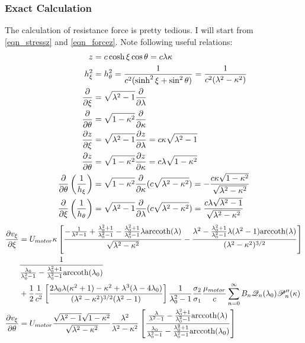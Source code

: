 \documentclass[fontsize=11pt, %
                             paper=a4, %
                             twoside, %
                             captions=tableheading,
                             index=totoc,
                             hyperref]{labbook}
\begin{document}
\begin{addmargin}[4cm]{0cm}
\subsubsection{Exact Calculation}
The calculation of resistance force is pretty tedious. I will start from \ref{eqn_stressz} and \ref{eqn_forcez}. Note following useful relations:
\begin{equation}
\begin{aligned}
z&=c\cosh\xi\cos\theta=c\lambda\kappa\\
h_\xi^2&=h_\theta^2=\frac{1}{c^2(\sinh^2\xi+\sin^2\theta)}=\frac{1}{c^2(\lambda^2-\kappa^2)}\\
\frac{\partial }{\partial \xi}&=\sqrt{\lambda^2-1}\frac{\partial }{\partial \lambda}\\
\frac{\partial }{\partial \theta}&=\sqrt{1-\kappa^2}\frac{\partial }{\partial \kappa}\\
\frac{\partial z}{\partial \xi}&=\sqrt{\lambda^2-1}\frac{\partial z}{\partial \lambda}=c\kappa\sqrt{\lambda^2-1}\\
\frac{\partial z}{\partial \theta}&=\sqrt{1-\kappa^2}\frac{\partial z}{\partial \kappa}=c\lambda\sqrt{1-\kappa^2}\\
\frac{\partial }{\partial \theta}\left(\frac{1}{h_\xi}\right)&=\sqrt{1-\kappa^2}\frac{\partial }{\partial \kappa}(c\sqrt{\lambda^2-\kappa^2})=-\frac{c\kappa\sqrt{1-\kappa^2}}{\sqrt{\lambda^2-\kappa^2}}\\
\frac{\partial }{\partial \xi}\left(\frac{1}{h_\theta}\right)&=\sqrt{\lambda^2-1}\frac{\partial }{\partial \lambda}(c\sqrt{\lambda^2-\kappa^2})=\frac{c\lambda\sqrt{\lambda^2-1}}{\sqrt{\lambda^2-\kappa^2}}\\
\end{aligned}
\end{equation}
\begin{equation}
\begin{aligned}
\pd{v_\xi}{\xi}&=U_{motor}\kappa\left[\frac{-\frac{1}{\lambda^2-1}+\frac{\lambda_0^2+1}{\lambda_0^2-1}-\frac{\lambda_0^2+1}{\lambda_0^2-1}\lambda \mathrm{arccoth}(\lambda)}{\sqrt{\lambda^2-\kappa^2}}-\frac{\lambda^2-\frac{\lambda_0^2+1}{\lambda_0^2-1}\lambda(\lambda^2-1)\mathrm{arccoth}(\lambda)}{(\lambda^2-\kappa^2)^{3/2}}\right]\\
&\frac{1}{\frac{\lambda_0}{\lambda_0^2-1}-\frac{\lambda_0^2+1}{\lambda_0^2-1}\mathrm{arccoth}(\lambda_0)}\\
&+\frac{1}{2}\frac{1}{c^2}\left[\frac{2\lambda_0\lambda(\kappa^2+1)-\kappa^2+\lambda^3(\lambda-4\lambda_0)}{(\lambda^2-\kappa^2)^{3/2}(\lambda^2-1)}\right]\frac{1}{\lambda_0^2-1}\frac{\sigma_2}{\sigma_1}\frac{\mu_{motor}}{c}\sum_{n=0}^\infty B_n \mathscr{Q}_n(\lambda_0)\mathscr{P}_n^{\prime\prime}(\kappa)\\
\pd{v_\xi}{\theta}&=U_{motor}\frac{\sqrt{\lambda^2-1}\sqrt{1-\kappa^2}}{\sqrt{\lambda^2-\kappa^2}}\frac{\lambda^2}{\lambda^2-\kappa^2}\left[\frac{\frac{\lambda}{\lambda^2-1}-\frac{\lambda_0^2+1}{\lambda_0^2-1}\mathrm{arccoth}(\lambda)}{\frac{\lambda_0}{\lambda_0^2-1}-\frac{\lambda_0^2+1}{\lambda_0^2-1}\mathrm{arccoth}(\lambda_0)}\right]\\

\end{aligned}
\end{equation}
\end{addmargin}
\end{document}
